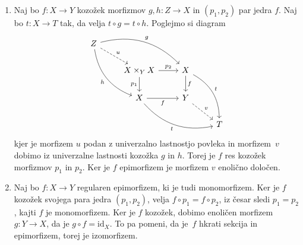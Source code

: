 \documentclass[../kategoricna_logika.tex]{subfiles}
\begin{document}
\begin{dokaz}
  \begin{enumerate}[label=(\roman*)]
  \item %
    Naj bo $f : X \to Y$ kozožek morfizmov $g,h : Z \to X$ in
    $(p_1, p_2)$ par jedra $f$.  Naj bo $t : X \to T$ tak, da velja
    $t \circ g = t \circ h$. Poglejmo si diagram
    \begin{equation*}
      \begin{tikzcd}[row sep=normal, column sep=normal]
        Z \ar[ddr, bend right, "h"'] \ar[dr, dashed, "u"] \ar[drr, bend left, "g"] & & & \\
        & X \times_Y X \ar[d, "p_1"'] \ar[r, "p_2"] & X \ar[d, "f"] \ar[ddr, bend left, "t"] & \\
        & X \ar[r, "f"'] \ar[drr, bend right, "t"'] & Y \ar[dr, dashed, "v"] & \\
        & & & T
      \end{tikzcd}
    \end{equation*}
    kjer je morfizem $u$ podan z univerzalno lastnostjo povleka in
    morfizem~$v$ dobimo iz univerzalne lastnosti kozožka $g$ in $h$.
    Torej je $f$ res kozožek morfizmov $p_1$ in $p_2$. Ker je $f$ epimorfizem
    je morfizem $v$ enolično določen.

  \item %
    Naj bo $f : X \to Y$ regularen epimorfizem, ki je tudi
    monomorfizem.  Ker je $f$ kozožek svojega para jedra $(p_1, p_2)$,
    velja $f \circ p_1 = f \circ p_2$, iz česar sledi $p_1 = p_2$,
    kajti $f$ je monomorfizem.  Ker je $f$ kozožek, dobimo enoličen
    morfizem $g : Y \to X$, da je $g \circ f = \mathrm{id}_X$.  To pa
    pomeni, da je~$f$ hkrati sekcija in epimorfizem, torej je
    izomorfizem.


\end{enumerate}
\end{dokaz}
\end{document}
